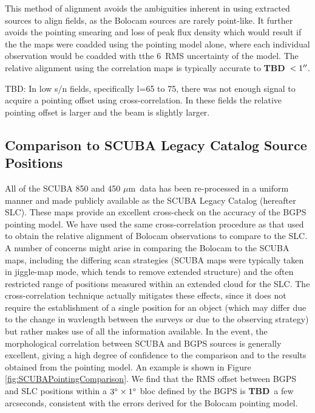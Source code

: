 \documentclass[12pt,preprint]{aastex}
\newcommand{\mum}{\ensuremath{\mu \mathrm{m}}}
\newcommand{\TBD}{{\bf TBD}}
\begin{document}
This method of alignment avoids the ambiguities inherent in using
extracted sources to align fields, as the Bolocam sources are rarely
point-like.  It further avoids the pointing smearing and loss of peak
flux density which would result if the the maps were coadded using the
pointing model alone, where each individual observation would be
coadded with tthe 6\arcsec\ RMS uncertainty of the model.  The
relative alignment using the correlation maps is typically accurate to
\TBD\ $<1\mbox{$^{\prime\prime}$}$.

TBD: In low s/n fields, specifically l=65 to 75, there was not enough signal to
acquire a pointing offset using cross-correlation.  In these fields the
relative pointing offset is larger and the beam is slightly larger.

\subsection{Comparison to SCUBA Legacy Catalog Source Positions}
\label{sec:SCUBAPointingComparison}

All of the SCUBA 850 and 450 \mum\ data has been re-processed in a
uniform manner and made publicly available as the SCUBA Legacy Catalog
(hereafter SLC).  These maps provide an excellent cross-check on the
accuracy of the BGPS pointing model.  We have used the same
cross-correlation procedure as that used to obtain the relative
alignment of Bolocam observations to compare to the SLC.  A number of
concerns might arise in comparing the Bolocam to the SCUBA maps,
including the differing scan strategies (SCUBA maps were typically
taken in jiggle-map mode, which tends to remove extended structure)
and the often restricted range of positions measured within an
extended cloud for the SLC.  The cross-correlation technique actually
mitigates these effects, since it does not require the establishment
of a single position for an object (which may differ due to the change
in wavlength between the surveys or due to the observing strategy) but
rather makes use of all the information available.  In the event, the
morphological correlation between SCUBA and BGPS sources is generally
excellent, giving a high degree of confidence to the comparison and to
the results obtained from the pointing model.  An example is shown in
Figure \ref{fig:SCUBAPointingComparison}.  We find that the RMS offset
between BGPS and SLC positions within a $3\mbox{$^\circ$} \times 1\mbox{$^\circ$}$
bloc defined by the BGPS is \TBD\ a few arcseconds, consistent with
the errors derived for the Bolocam pointing model.
\end{document}
